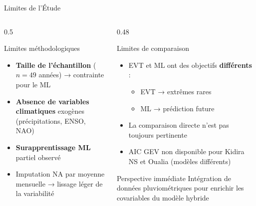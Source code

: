 \documentclass[aspectratio=169, 9pt]{beamer}
\begin{document}
\begin{frame}{Limites de l'Étude}
\begin{columns}[T]
\begin{column}{0.5\textwidth}
  \begin{alertblock}{Limites méthodologiques}
    \begin{itemize}
      \item \textbf{Taille de l'échantillon}
            ($n = 49$ années) → contrainte
            pour le ML
      \item \textbf{Absence de variables
            climatiques} exogènes
            (précipitations, ENSO, NAO)
      \item \textbf{Surapprentissage ML}
            partiel observé
      \item Imputation NA par moyenne
            mensuelle → lissage léger
            de la variabilité
    \end{itemize}
  \end{alertblock}
\end{column}
\begin{column}{0.48\textwidth}
  \begin{alertblock}{Limites de comparaison}
    \begin{itemize}
      \item EVT et ML ont des objectifs
            \textbf{différents} :
            \begin{itemize}
              \item EVT → extrêmes rares
              \item ML → prédiction future
            \end{itemize}
      \item La comparaison directe
            n'est pas toujours pertinente
      \item AIC GEV non disponible pour
            Kidira NS et Oualia
            (modèles différents)
    \end{itemize}
  \end{alertblock}
  \vspace{0.1cm}
  \begin{block}{Perspective immédiate}
  \small
    Intégration de données pluviométriques
    pour enrichir les covariables du
    modèle hybride
  \end{block}
\end{column}
\end{columns}
\end{frame}
\end{document}
